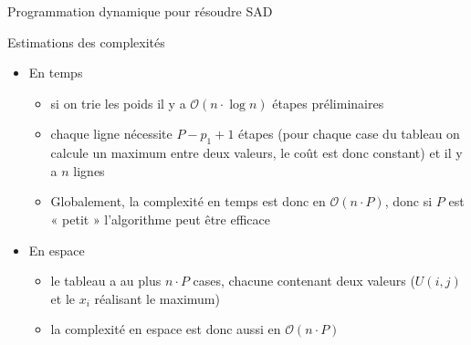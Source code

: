 \documentclass[aspectratio=1610,francais,envcountsect]{beamer}
\begin{document}
\begin{frame}{Programmation dynamique pour résoudre SAD
    \insertcontinuationtext}

  \begin{block}{Estimations des complexités}

    \begin{itemize}
    \item En temps
      \begin{itemize}
      \item si on trie les poids il y a $\mathcal{O}(n\cdot\log n)$
        étapes préliminaires
      \item chaque ligne nécessite $P - p_1 + 1$ étapes (pour chaque
        case du tableau on calcule un maximum entre deux valeurs, le
        coût est donc constant) et il y a $n$ lignes
      \item Globalement, la complexité en temps est donc en
        $\mathcal{O}(n\cdot P)$, donc si $P$ est « petit »
        l’algorithme peut être efficace
      \end{itemize}
    \item En espace
      \begin{itemize}
      \item le tableau a au plus $n\cdot P$ cases, chacune contenant
        deux valeurs ($U(i, j)$ et le $x_i$ réalisant le maximum)
      \item la complexité en espace est donc aussi en
        $\mathcal{O}(n\cdot P)$
      \end{itemize}
    \end{itemize}
  \end{block}

\end{frame}
\end{document}
